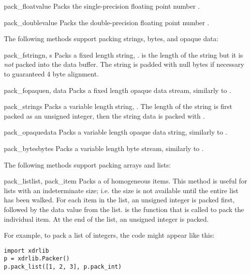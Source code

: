 \begin{methoddesc}[Packer]{pack_float}{value}
Packs the single-precision floating point number .
\end{methoddesc}

\begin{methoddesc}[Packer]{pack_double}{value}
Packs the double-precision floating point number .
\end{methoddesc}

The following methods support packing strings, bytes, and opaque data:

\begin{methoddesc}[Packer]{pack_fstring}{n, s}
Packs a fixed length string, .   is the length of the
string but it is \emph{not} packed into the data buffer.  The string
is padded with null bytes if necessary to guaranteed 4 byte alignment.
\end{methoddesc}

\begin{methoddesc}[Packer]{pack_fopaque}{n, data}
Packs a fixed length opaque data stream, similarly to
.
\end{methoddesc}

\begin{methoddesc}[Packer]{pack_string}{s}
Packs a variable length string, .  The length of the string is
first packed as an unsigned integer, then the string data is packed
with .
\end{methoddesc}

\begin{methoddesc}[Packer]{pack_opaque}{data}
Packs a variable length opaque data string, similarly to
.
\end{methoddesc}

\begin{methoddesc}[Packer]{pack_bytes}{bytes}
Packs a variable length byte stream, similarly to .
\end{methoddesc}

The following methods support packing arrays and lists:

\begin{methoddesc}[Packer]{pack_list}{list, pack_item}
Packs a  of homogeneous items.  This method is useful for
lists with an indeterminate size; i.e. the size is not available until
the entire list has been walked.  For each item in the list, an
unsigned integer  is packed first, followed by the data value
from the list.   is the function that is called to pack
the individual item.  At the end of the list, an unsigned integer
 is packed.

For example, to pack a list of integers, the code might appear like
this:

\begin{verbatim}
import xdrlib
p = xdrlib.Packer()
p.pack_list([1, 2, 3], p.pack_int)
\end{verbatim}
\end{methoddesc}

